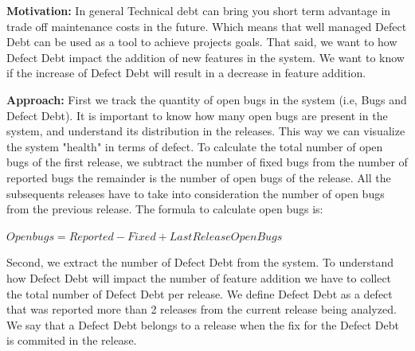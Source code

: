 
\vspace{3mm}
\noindent\rqii
\vspace{3mm}

\noindent\textbf{Motivation:} In general Technical debt can bring you short term advantage in trade off maintenance costs in the future. Which means that well managed Defect Debt can be used as a tool to achieve projects goals. That said, we want to how Defect Debt impact the addition of new features in the system. We want to know if the increase of Defect Debt will result in a decrease in feature addition. 

\vspace{1mm}
\noindent\textbf{Approach:} First we track the quantity of open bugs in the system (i.e, Bugs and Defect Debt). It is important to know how many open bugs are present in the system, and understand its distribution in the releases. This way we can visualize the system "health" in terms of defect. To calculate the total number of open bugs of the first release, we subtract the number of fixed bugs from the number of reported bugs the remainder is the number of open bugs of the release. All the subsequents releases have to take into consideration the number of open bugs from the previous release. The formula to calculate open bugs is:

\begin{center}
	$Open bugs=  Reported - Fixed + Last Release OpenBugs$
\end{center}


Second, we extract the number of  Defect Debt from the system. To understand how Defect Debt will impact the number of feature addition we have to collect the total number of Defect Debt per release. We define Defect Debt as a defect that was reported more than 2 releases from the current release being analyzed. We say that a Defect Debt belongs to a release when the fix for the Defect Debt is commited in the release.
 
